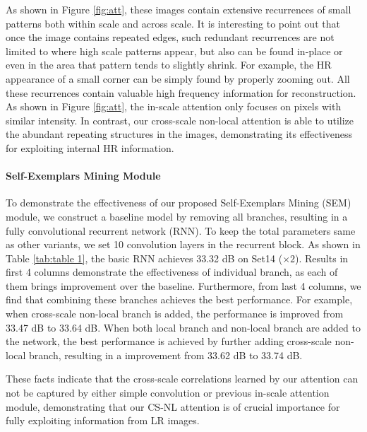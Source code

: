 \documentclass[10pt,twocolumn,letterpaper]{article}
\begin{document}
As shown in Figure \ref{fig:att}, these images contain extensive recurrences of small patterns both within scale and across scale. It is interesting to point out that once the image contains repeated edges, such redundant recurrences are not limited to where high scale patterns appear, but also can be found in-place or even in the area that pattern tends to slightly shrink. For example, the HR appearance of a small corner can be simply found by properly zooming out. All these recurrences contain valuable high frequency information for reconstruction. As shown in Figure \ref{fig:att}, the in-scale attention only focuses on pixels with similar intensity. In contrast, our cross-scale non-local attention is able to utilize the abundant repeating structures in the images, demonstrating its effectiveness for exploiting internal HR information. 

\paragraph{Self-Exemplars Mining Module} 
To demonstrate the effectiveness of our proposed Self-Exemplars Mining (SEM) module, we construct a baseline model by removing all branches, resulting in a fully convolutional recurrent network (RNN). To keep the total parameters same as other variants, we set 10 convolution layers in the recurrent block. As shown in Table \ref{tab:table 1}, the basic RNN achieves 33.32 dB on Set14 ($\times2$). Results in first 4 columns demonstrate the effectiveness of individual branch, as each of them brings improvement over the baseline. Furthermore, from last 4 columns, we find that combining these branches achieves the best performance. For example, when cross-scale non-local branch is added, the performance is improved from 33.47 dB to 33.64 dB. When both local branch and non-local branch are added to the network, the best performance is achieved by further adding cross-scale non-local branch, resulting in a improvement from 33.62 dB to 33.74 dB. 

These facts indicate that the cross-scale correlations learned by our attention can not be captured by either simple convolution or previous in-scale attention module, demonstrating that our CS-NL attention is of crucial importance for fully exploiting information from LR images.
\end{document}
